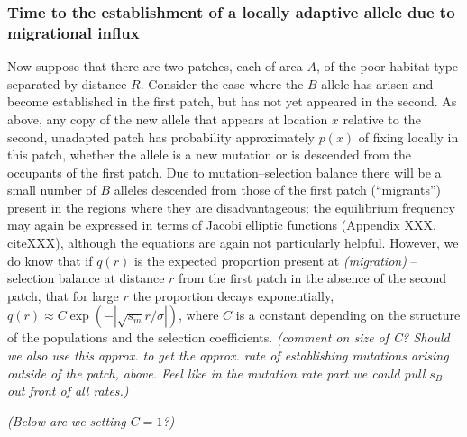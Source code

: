 \documentclass{article}
\newcommand{\gc}[1]{{ \it \color{green} (#1) } }
\begin{document}
\subsubsection{Time to the establishment of a locally adaptive allele
  due to migrational influx}
\label{ss:patchymigration}
Now suppose that there are two patches, each of area $A$, of the poor
habitat type separated by distance $R$. Consider the case where the
$B$ allele has arisen and become established in the first patch, but has not yet appeared in the second.
As above, any copy of the new allele that appears at location $x$ relative to the second, unadapted patch 
has probability approximately $p(x)$ of fixing locally in this patch,
whether the allele is a new mutation or is descended from the occupants of the first patch.
Due to mutation--selection balance there will be a small number of $B$ alleles descended from those of the first patch (``migrants'') 
present in the regions where they are disadvantageous;
the equilibrium frequency may again be expressed in terms of Jacobi elliptic functions (Appendix XXX, citeXXX),
although the equations are again not particularly helpful.
However, we do know that if $q(r)$ is the expected proportion present at \gc{migration}--selection balance at distance $r$ from the first patch
in the absence of the second patch, that for large $r$ the proportion decays exponentially, $q(r) \approx C \exp( -|\sqrt{s_m} r / \sigma|)$,
where $C$ is a constant depending on the structure of the populations
and the selection coefficients. \gc{comment on size of C? Should we
  also use this approx. to get the approx. rate of establishing mutations
  arising outside of the patch, above. Feel like in the mutation rate
  part we could pull $s_B$ out front of all rates.} 

\gc{Below are we setting $C=1$?}
\end{document}

